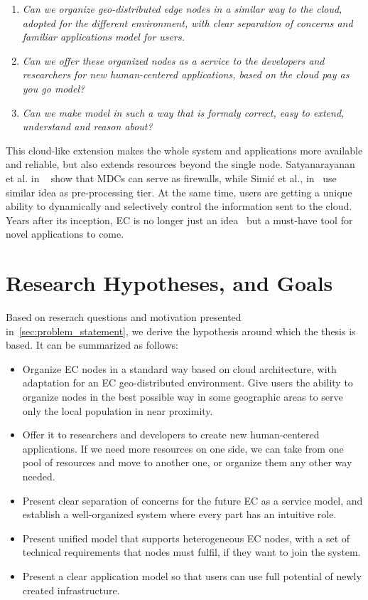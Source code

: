 \begin{enumerate}[start=1,label={(\bfseries \arabic*)}]
	\item \textit{Can we organize geo-distributed edge nodes in a similar way to the cloud, adopted for the different  environment, with clear separation of concerns and familiar applications model for users.}
	\item \textit{Can we offer these organized nodes as a service to the developers and researchers for new human-centered applications, based on the cloud pay as you go model?}
	\item \textit{Can we make model in such a way that is formaly correct, easy to extend, understand and reason about?}
\end{enumerate}

This cloud-like extension makes the whole system and applications more available and reliable, but also extends resources beyond the single node. Satyanarayanan et al. in ~\cite{SatyanarayananK19} show that MDCs can serve as firewalls, while Simi\' c et al., in~\cite{inproceedingsSimic1} use similar idea as pre-processing tier. At the same time, users are getting a unique ability to dynamically and selectively control the information sent to the cloud. Years after its inception, EC is no longer just an idea~\cite{SatyanarayananK19} but a must-have tool for novel applications to come.
%
%
\section{Research Hypotheses, and Goals}\label{sec:research_hyphotesis_and_golas}
%
Based on reserach questions and motivation presented in~\ref{sec:problem_statement}, we derive the hypothesis around which the thesis is based. It can be summarized as follows:

\begin{itemize}
	\item Organize EC nodes in a standard way based on cloud architecture, with adaptation for an EC geo-distributed environment. Give users the ability to organize nodes in the best possible way in some geographic areas to serve only the local population in near proximity.
	\item Offer it to researchers and developers to create new human-centered applications. If we need more resources on one side, we can take from one pool of resources and move to another one, or organize them any other way needed.
	\item Present clear separation of concerns for the future EC as a service model, and establish a well-organized system where every part has an intuitive role. 
	\item Present unified model that supports heterogeneous EC nodes, with a set of technical requirements that nodes must fulfil, if they want to join the system.
	\item Present a clear application model so that users can use full potential of newly created infrastructure.
\end{itemize}

